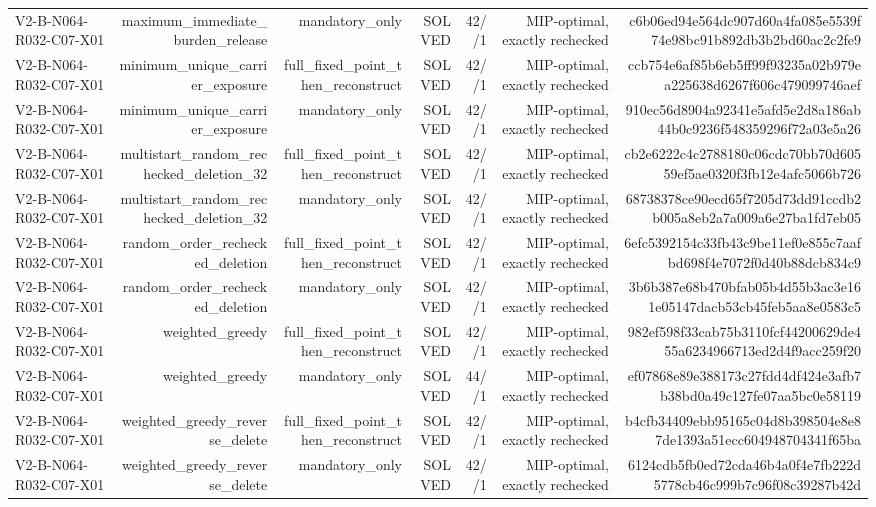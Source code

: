 {\begin{longtable}{lrrrrrr}
V2-B-N064-R032-C07-X01 & maximum\_immediate\_burden\_release & mandatory\_only & SOLVED & 42//1 & MIP-optimal, exactly rechecked & c6b06ed94e564dc907d60a4fa085e5539f74e98bc91b892db3b2bd60ac2c2fe9 \\
V2-B-N064-R032-C07-X01 & minimum\_unique\_carrier\_exposure & full\_fixed\_point\_then\_reconstruct & SOLVED & 42//1 & MIP-optimal, exactly rechecked & ccb754e6af85b6eb5ff99f93235a02b979ea225638d6267f606c479099746aef \\
V2-B-N064-R032-C07-X01 & minimum\_unique\_carrier\_exposure & mandatory\_only & SOLVED & 42//1 & MIP-optimal, exactly rechecked & 910ec56d8904a92341e5afd5e2d8a186ab44b0c9236f548359296f72a03e5a26 \\
V2-B-N064-R032-C07-X01 & multistart\_random\_rechecked\_deletion\_32 & full\_fixed\_point\_then\_reconstruct & SOLVED & 42//1 & MIP-optimal, exactly rechecked & cb2e6222c4c2788180c06cdc70bb70d60559ef5ae0320f3fb12e4afc5066b726 \\
V2-B-N064-R032-C07-X01 & multistart\_random\_rechecked\_deletion\_32 & mandatory\_only & SOLVED & 42//1 & MIP-optimal, exactly rechecked & 68738378ce90ecd65f7205d73dd91ccdb2b005a8eb2a7a009a6e27ba1fd7eb05 \\
V2-B-N064-R032-C07-X01 & random\_order\_rechecked\_deletion & full\_fixed\_point\_then\_reconstruct & SOLVED & 42//1 & MIP-optimal, exactly rechecked & 6efc5392154c33fb43c9be11ef0e855c7aafbd698f4e7072f0d40b88dcb834c9 \\
V2-B-N064-R032-C07-X01 & random\_order\_rechecked\_deletion & mandatory\_only & SOLVED & 42//1 & MIP-optimal, exactly rechecked & 3b6b387e68b470bfab05b4d55b3ac3e161e05147dacb53cb45feb5aa8e0583c5 \\
V2-B-N064-R032-C07-X01 & weighted\_greedy & full\_fixed\_point\_then\_reconstruct & SOLVED & 42//1 & MIP-optimal, exactly rechecked & 982ef598f33cab75b3110fcf44200629de455a6234966713ed2d4f9acc259f20 \\
V2-B-N064-R032-C07-X01 & weighted\_greedy & mandatory\_only & SOLVED & 44//1 & MIP-optimal, exactly rechecked & ef07868e89e388173c27fdd4df424e3afb7b38bd0a49c127fe07aa5bc0e58119 \\
V2-B-N064-R032-C07-X01 & weighted\_greedy\_reverse\_delete & full\_fixed\_point\_then\_reconstruct & SOLVED & 42//1 & MIP-optimal, exactly rechecked & b4cfb34409ebb95165c04d8b398504e8e87de1393a51ecc604948704341f65ba \\
V2-B-N064-R032-C07-X01 & weighted\_greedy\_reverse\_delete & mandatory\_only & SOLVED & 42//1 & MIP-optimal, exactly rechecked & 6124cdb5fb0ed72cda46b4a0f4e7fb222d5778cb46c999b7c96f08c39287b42d \\

\end{longtable}}
